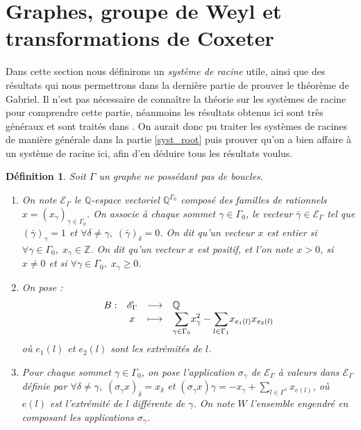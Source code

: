\documentclass[a4paper,11pt]{article}
\newtheorem{defi}[thm]{Définition}%
\newcommand{\dps}{\displaystyle}
\begin{document}
\section{Graphes, groupe de Weyl et transformations de Coxeter}
\label{rootz}
Dans cette section nous définirons un \emph{système de racine} utile, ainsi que des résultats qui nous permettrons dans la dernière partie de prouver le théorème de Gabriel. Il n'est pas nécessaire de connaître la théorie sur les systèmes de racine pour comprendre cette partie, néanmoins les résultats obtenus ici sont très généraux et sont traités dans \cite{S66}. On aurait donc pu traiter les systèmes de racines de manière générale dans la partie \ref{syst_root} puis prouver qu'on a bien affaire à un système de racine ici, afin d'en déduire tous les résultats voulus.
		\begin{defi}
		Soit $\Gamma$ un graphe ne possédant pas de boucles.
		\begin{enumerate}
			\item On note $\mathscr E_{\Gamma}$ le $\mathbb Q$-espace vectoriel $\mathbb Q^{\Gamma_0}$ composé des familles de rationnels $x=(x_\gamma)_{\gamma\in\Gamma_0}$. On associe à chaque sommet $\gamma\in\Gamma_0$, le vecteur $\bar{\gamma}\in\mathscr E_\Gamma$ tel que $(\bar\gamma)_\gamma=1$ et $\forall \delta\neq\gamma,\;(\bar\gamma)_\delta=0$. On dit qu'un vecteur $x$ est \emph{entier} si $\forall\gamma\in\Gamma_{0},\;x_\gamma\in\mathbb Z$. On dit qu'un vecteur $x$ est \emph{positif}, et l'on note $x>0$, si $x\neq0$ et si $\forall\gamma\in\Gamma_0,\;x_\gamma\geq0$.
			\item On pose :
				\[
					\begin{array}{rcc>{\dps}l}
					B:&\mathscr E_{\Gamma}&\longrightarrow&\mathbb Q\\
					&x&\longmapsto&\underset{\gamma\in\Gamma_0}{\sum} x_\gamma^2-\underset{l\in\Gamma_1}{\sum}x_{e_1(l)}x_{e_2(l)}\\
				\end{array}
			\]
			où $e_1(l)$ et $e_2(l)$ sont les extrémités de $l$.
		\item Pour chaque sommet $\gamma\in\Gamma_0$, on pose l'application $\sigma_\gamma$ de $\mathscr E_\Gamma$ à valeurs dans $\mathscr E_\Gamma$ définie par $\forall\delta\neq\gamma,\; (\sigma_\gamma x)_\delta=x_\delta$ et $(\sigma_\gamma x)\gamma=-x_\gamma+\sum_{l\in\Gamma^\gamma}x_{e(l)}$, où $e(l)$ est l'extrémité de $l$ différente de $\gamma$. On note $W$ l'ensemble engendré en composant les applications $\sigma_\gamma$.
		\end{enumerate}
		\end{defi}
\end{document}
